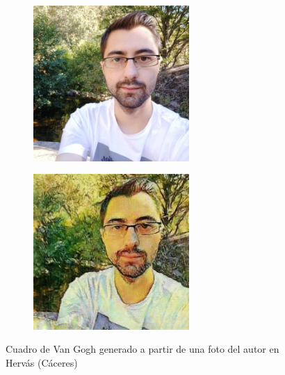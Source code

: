 \documentclass[[../main.tex]{subfiles}
\begin{document}
        \begin{figure}[!htb]
            \begin{subfigure}[b]{0.49\textwidth}
            \includegraphics[width=0.65\textwidth]{imagenes/imagen2cuadro/propias/vangogh/IMG_20200830_174622.jpg}
            \end{subfigure}
        \hfill
            \begin{subfigure}[b]{0.49\textwidth}
            \includegraphics[width=0.65\textwidth]{imagenes/imagen2cuadro/propias/vangogh/IMG_20200830_174622_2.jpg}
            \end{subfigure}
        \caption{Cuadro de Van Gogh generado a partir de una foto del autor en Hervás (Cáceres)}
        \label{fig:vangogh_cuadro_hervas}
        \end{figure}
        
\end{document}
